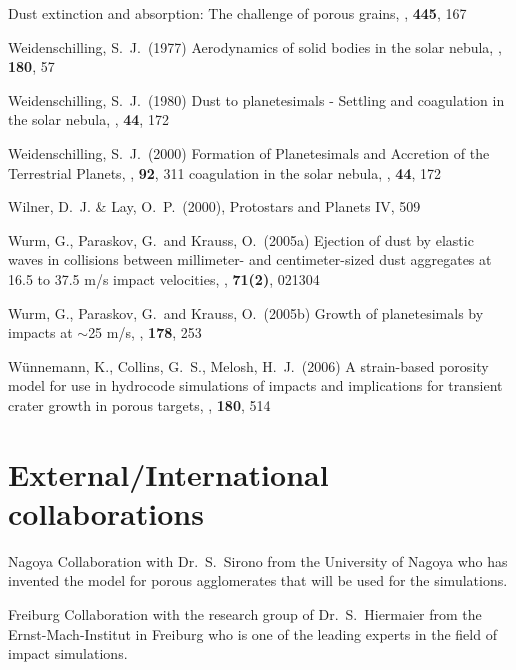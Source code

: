 \begin{literature}
Dust extinction and absorption: The challenge of porous grains, \aap,
\textbf{445}, 167
\item Weidenschilling, S.~J.~(1977) Aerodynamics of solid bodies in the
solar nebula, \mn, \textbf{180}, 57
\item Weidenschilling, S.~J.~(1980) Dust to planetesimals - Settling and
coagulation in the solar nebula, \ica, \textbf{44}, 172
\item Weidenschilling, S.~J.~(2000) Formation of Planetesimals and
Accretion of the Terrestrial Planets, \ssr, \textbf{92}, 311
coagulation in the solar nebula, \ica, \textbf{44}, 172
\item
{Wilner}, D.~J. \& {Lay}, O.~P.~(2000), Protostars and Planets IV, 509
\item Wurm, G., Paraskov, G.~and Krauss, O.~(2005a)
Ejection of dust by elastic waves in collisions between millimeter- and
centimeter-sized dust aggregates at 16.5 to 37.5 m/s impact velocities,
\phre, \textbf{71(2)}, 021304
\item Wurm, G., Paraskov, G.~and Krauss,
O.~(2005b) Growth of planetesimals by impacts at $\sim$25 m/s, \ica,
\textbf{178}, 253
\item W{\"u}nnemann, K., Collins, G.~S., Melosh, H.~J.~(2006) A
strain-based porosity model for use in hydrocode simulations of impacts
and implications for transient crater growth in porous targets, \ica,
\textbf{180}, 514
\end{literature}



\section{External/International collaborations}
\begin{collablist}
\item[Nagoya] Collaboration with Dr.~S.~Sirono from the University of
Nagoya who has invented the
model for porous agglomerates that will be used for the simulations.
\item[Freiburg] Collaboration with the research group of  
Dr.~S.~Hiermaier from the
Ernst-Mach-Institut in Freiburg who is one of the leading experts in  
the field
of impact simulations.
\end{collablist}


